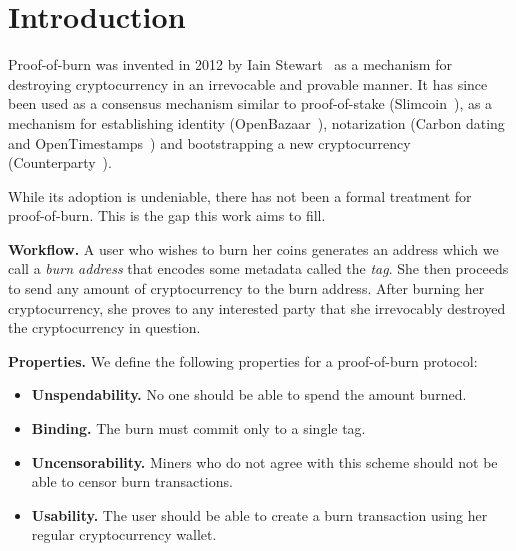 \section{Introduction}\label{section:introduction}
Proof-of-burn was invented in 2012 by Iain Stewart~\cite{stewart} as a mechanism for destroying cryptocurrency in an irrevocable and provable manner. It has since been used as a consensus mechanism similar to proof-of-stake (Slimcoin~\cite{slimcoin}), as a mechanism for establishing identity (OpenBazaar~\cite{zindros2016trust}), notarization (Carbon dating~\cite{clark2012commitcoin} and OpenTimestamps~\cite{todd2016opentimestamps}) and bootstrapping a new cryptocurrency (Counterparty~\cite{counterparty}).

While its adoption is undeniable, there has not been a formal treatment for proof-of-burn. This is the gap this work aims to fill.

\noindent
\textbf{Workflow.}
A user who wishes to burn her coins generates an address which we call a \emph{burn address} that encodes some metadata called the \emph{tag}. She then proceeds to send any amount of cryptocurrency to the burn address. After burning her cryptocurrency, she proves to any interested party that she irrevocably destroyed the cryptocurrency in question.

\noindent
\textbf{Properties.}
We define the following properties for a proof-of-burn protocol:
\begin{itemize}
    \item \textbf{Unspendability.} No one should be able to spend the amount burned.
    \item \textbf{Binding.} The burn must commit only to a single tag.
    \item \textbf{Uncensorability.} Miners who do not agree with this scheme should not be able to censor burn transactions.
    \item \textbf{Usability.} The user should be able to create a burn transaction using her regular cryptocurrency wallet.
\end{itemize}


